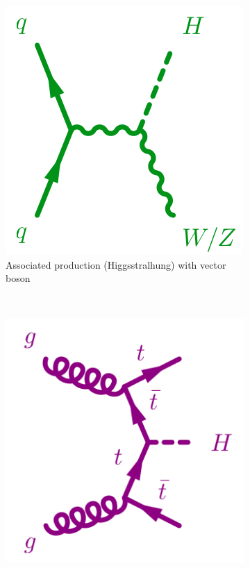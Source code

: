 \begin{figure}
        \begin{subfigure}[b]{0.3\textwidth}
                \includegraphics[width=\textwidth]{1_Introduction_Th_and_Exp/pics/Higgsstralhung.png}
                \caption{Associated production (Higgsstralhung) with vector boson}
                \label{fig:vh}
        \end{subfigure}
        ~ 
        \begin{subfigure}[b]{0.3\textwidth}
                \includegraphics[width=\textwidth]{1_Introduction_Th_and_Exp/pics/ttFusion.png}

\end{subfigure}
\end{figure}
